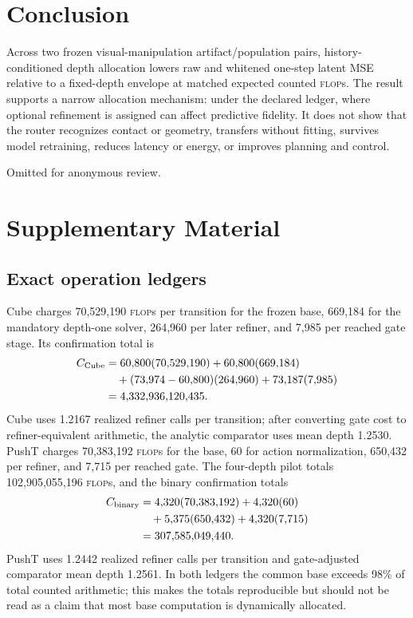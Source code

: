 \documentclass{article}
\newcommand{\flops}{\textsc{flop}s}
\begin{document}
\section{Conclusion}

Across two frozen visual-manipulation artifact/population pairs, history-conditioned depth allocation lowers raw and whitened one-step latent MSE relative to a fixed-depth envelope at matched expected counted \flops{}. The result supports a narrow allocation mechanism: under the declared ledger, where optional refinement is assigned can affect predictive fidelity. It does not show that the router recognizes contact or geometry, transfers without fitting, survives model retraining, reduces latency or energy, or improves planning and control.

\begin{ack}
Omitted for anonymous review.
\end{ack}

\clearpage



\clearpage
\appendix

\section{Supplementary Material}

\subsection{Exact operation ledgers}
\label{app:compute}

Cube charges 70,529,190 \flops{} per transition for the frozen base, 669,184 for the mandatory depth-one solver, 264,960 per later refiner, and 7,985 per reached gate stage. Its confirmation total is
\begin{align*}
C_{\rm Cube}
&=60{,}800(70{,}529{,}190)+60{,}800(669{,}184)\\
&\quad +(73{,}974-60{,}800)(264{,}960)+73{,}187(7{,}985)\\
&=4{,}332{,}936{,}120{,}435.
\end{align*}
Cube uses 1.2167 realized refiner calls per transition; after converting gate cost to refiner-equivalent arithmetic, the analytic comparator uses mean depth 1.2530. PushT charges 70,383,192 \flops{} for the base, 60 for action normalization, 650,432 per refiner, and 7,715 per reached gate. The four-depth pilot totals 102,905,055,196 \flops{}, and the binary confirmation totals
\begin{align*}
C_{\rm binary}
&=4{,}320(70{,}383{,}192)+4{,}320(60)\\
&\quad+5{,}375(650{,}432)+4{,}320(7{,}715)\\
&=307{,}585{,}049{,}440.
\end{align*}
PushT uses 1.2442 realized refiner calls per transition and gate-adjusted comparator mean depth 1.2561. In both ledgers the common base exceeds 98\% of total counted arithmetic; this makes the totals reproducible but should not be read as a claim that most base computation is dynamically allocated.
\end{document}
